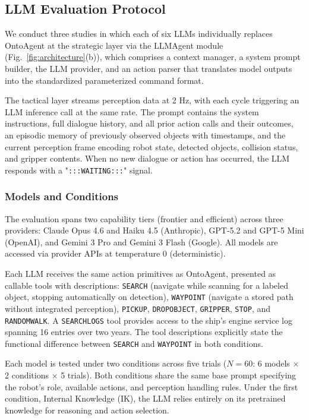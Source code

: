 \documentclass[letterpaper, 10 pt, conference]{ieeeconf}  %
\begin{document}
\subsection{LLM Evaluation Protocol}
\label{sec:llm_eval}


We conduct three studies in which each of six LLMs individually replaces OntoAgent at the strategic layer via the LLMAgent module (Fig.~\ref{fig:architecture}(b)), which comprises a context manager, a system prompt builder, the LLM provider, and an action parser that translates model outputs into the standardized 
parameterized command format.

The tactical layer streams perception data at 2 Hz, 
with each cycle triggering an LLM inference call at the same rate. The prompt contains the system instructions, full dialogue history, and all prior action calls and their outcomes, an episodic memory of previously observed objects with timestamps, and the current perception frame encoding robot state, detected objects, collision status, and gripper contents. When no new dialogue or action has occurred, the LLM responds with a "\texttt{:::WAITING:::}" signal.

\subsubsection{Models and Conditions}

The evaluation spans two capability tiers (frontier and 
efficient) across three providers: Claude Opus 4.6 and 
Haiku 4.5 (Anthropic), GPT-5.2 and GPT-5 Mini (OpenAI), 
and Gemini 3 Pro and Gemini 3 Flash (Google). All models 
are accessed via provider APIs at temperature 0 (deterministic).

Each LLM receives the same action primitives as OntoAgent, presented as callable tools with descriptions: \texttt{SEARCH} (navigate while scanning for a labeled object, stopping automatically on detection), \texttt{WAYPOINT} (navigate a stored path without integrated perception), \texttt{PICKUP}, \texttt{DROPOBJECT}, \texttt{GRIPPER}, \texttt{STOP}, and \texttt{RANDOMWALK}. A \texttt{SEARCHLOGS} tool provides access to the ship's engine service log spanning 16 entries over two years. The tool descriptions explicitly state the functional difference between \texttt{SEARCH} and \texttt{WAYPOINT} in both conditions.

Each model is tested under two conditions across five 
trials ($N=60$: 6 models $\times$ 2 conditions $\times$ 5 trials). Both conditions share the same base prompt specifying the robot's role, available actions, and perception handling rules. Under the first condition, Internal Knowledge (IK), the LLM relies entirely on its pretrained knowledge for 
reasoning and action selection.
\end{document}
